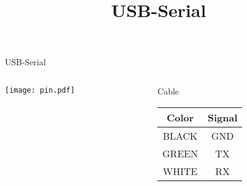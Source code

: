 \documentclass{beamer}
\title[USB-Serial]{USB-Serial}
\begin{document}
\frame{\titlepage}

\begin{frame}{USB-Serial}
\begin{columns}
\begin{column}{0.5\textwidth}
\texttt{[image: pin.pdf]}
\end{column}
\begin{column}{0.5\textwidth}
\begin{block}{Cable}
\vspace{5mm}
\begin{tabular}{c|c}
Color & Signal\\
\hline
BLACK & GND\\
GREEN & TX\\
WHITE & RX
\end{tabular}
\end{block}
\end{column}
\end{columns}
\end{frame}
\end{document}
